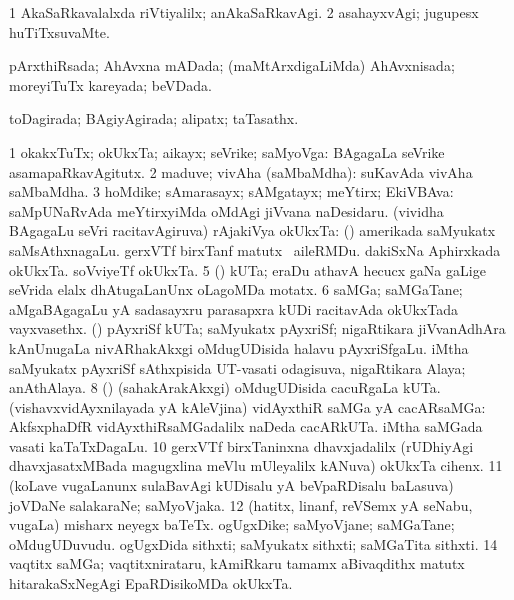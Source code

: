 \bentry
{} 
\gl{\kirxvi}
\expl{}
\bmng
\bnum
\num{1} AkaSaRkavalalxda riVtiyalilx; anAkaSaRkavAgi. 
\num{2} asahayxvAgi; jugupesx huTiTxsuvaMte. 
\enum
\emng
\eentry

\bentry
{} 
\gl{\gu}
\expl{}
\bmng
pArxthiRsada; AhAvxna mADada; (maMtArxdigaLiMda) AhAvxnisada; moreyiTuTx kareyada; beVDada. 
\emng
\eentry

\bentry
{} 
\gl{\gu}
\expl{}
\bmng
toDagirada; BAgiyAgirada; alipatx; taTasathx. 
\emng
\eentry

\bentry
{} 
\gl{\nA}
\expl{}
\bmng
\bnum
\num{1} okakxTuTx; okUkxTa; aikayx; seVrike; saMyoVga:  BAgagaLa seVrike asamapaRkavAgitutx. 
\num{2} maduve; vivAha (saMbaMdha):  suKavAda vivAha saMbaMdha. 
\num{3} hoMdike; sAmarasayx; sAMgatayx; meYtirx; EkiVBAva:  saMpUNaRvAda meYtirxyiMda oMdAgi jiVvana naDesidaru. 
 (vividha BAgagaLu seVri racitavAgiruva) rAjakiVya okUkxTa: 
\banum
{} (\kanmu) amerikada saMyukatx saMsAthxnagaLu. 
 gerxVTf birxTanf matutx \kanu\ aileRMDu. 
 dakiSxNa Aphirxkada okUkxTa. 
 soVviyeTf okUkxTa. 
\eanum
\numie
\num{5} (\ga) kUTa; eraDu athavA hecucx gaNa  gaLige seVrida elalx dhAtugaLanUnx oLagoMDa motatx. 
\num{6} saMGa; saMGaTane; aMgaBAgagaLu yA sadasayxru parasapxra kUDi racitavAda okUkxTada vayxvasethx. 
\banum
{} (\ca) pAyxriSf kUTa; saMyukatx pAyxriSf; nigaRtikara jiVvanAdhAra kAnUnugaLa nivARhakAkxgi oMdugUDisida halavu pAyxriSfgaLu. 
\hypertarget{union(7)b}{} 
 iMtha saMyukatx pAyxriSf sAthxpisida UT-vasati odagisuva, nigaRtikara Alaya; anAthAlaya. 
\eanum
\numie
\num{8} (\birx) (sahakArakAkxgi) oMdugUDisida cacuRgaLa kUTa. 
\banum
{} (vishavxvidAyxnilayada yA kAleVjina) vidAyxthiR saMGa yA cacARsaMGa:  AkfsxphaDfR vidAyxthiRsaMGadalilx naDeda cacARkUTa. 
 iMtha saMGada vasati kaTaTxDagaLu. 
\eanum
\numie
\num{10} gerxVTf birxTaninxna dhavxjadalilx (rUDhiyAgi dhavxjasatxMBada magugxlina meVlu mUleyalilx kANuva) okUkxTa cihenx. 
\num{11} (koLave \mo vugaLanunx sulaBavAgi kUDisalu yA beVpaRDisalu baLasuva) joVDaNe salakaraNe; saMyoVjaka.  
\num{12} (hatitx, linanf, reVSemx yA seNabu, \mo vugaLa) misharx neyegx baTeTx. 
\banum
{} ogUgxDike; saMyoVjane; saMGaTane; oMdugUDuvudu. 
 ogUgxDida sithxti; saMyukatx sithxti; saMGaTita sithxti. 
\eanum
\numie
\num{14} vaqtitx saMGa; vaqtitxnirataru, kAmiRkaru tamamx aBivaqdithx matutx hitarakaSxNegAgi EpaRDisikoMDa okUkxTa. 
\enum
\emng

